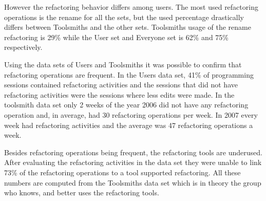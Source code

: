 However the refactoring behavior differs among users. The most used refactoring operations is the rename for all the sets, but the used percentage drastically differs between Toolsmiths and the other sets. Toolsmiths usage of the rename refactoring is 29\% while the User set and Everyone set is 62\% and 75\% respectively.

Using the data sets of Users and Toolsmiths it was possible to confirm that refactoring operations are frequent. 
In the Users data set, 41\% of programming sessions contained refactoring activities and the sessions that did not have refactoring activities were the sessions where less edits were made.
In the toolsmith data set only 2 weeks of the year 2006 did not have any refactoring operation and, in average, had 30 refactoring operations per week. 
In 2007 every week had refactoring activities and the average was 47 refactoring operations a week.

Besides refactoring operations being frequent, the refactoring tools are underused. 
After evaluating the refactoring activities in the data set they were unable to link 73\% of the refactoring operations to a tool supported refactoring. 
All these numbers are computed from the Toolsmiths data set which is in theory the group who knows, and better uses the refactoring tools.


